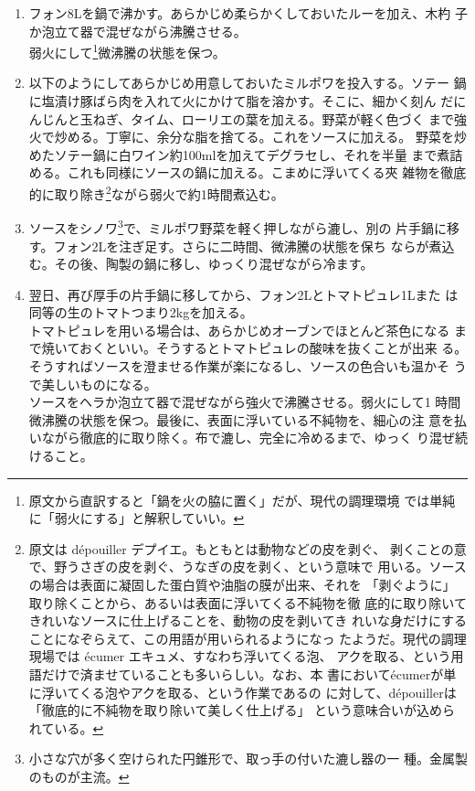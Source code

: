 \documentclass[twoside,12Q,b5j]{escoffierltjsbook}
\begin{document}
\begin{enumerate}
\def\labelenumi{\arabic{enumi}.}
\item
  フォン8Lを鍋で沸かす。あらかじめ柔らかくしておいたルーを加え、木杓
  子か泡立て器で混ぜながら沸騰させる。\\
  弱火にして\footnote{原文から直訳すると「鍋を火の脇に置く」だが、現代の調理環境
    では単純に「弱火にする」と解釈していい。}微沸騰の状態を保つ。
\item
  以下のようにしてあらかじめ用意しておいたミルポワを投入する。ソテー
  鍋に塩漬け豚ばら肉を入れて火にかけて脂を溶かす。そこに、細かく刻ん
  だにんじんと玉ねぎ、タイム、ローリエの葉を加える。野菜が軽く色づく
  まで強火で炒める。丁寧に、余分な脂を捨てる。これをソースに加える。
  野菜を炒めたソテー鍋に白ワイン約100mlを加えてデグラセし、それを半量
  まで煮詰める。これも同様にソースの鍋に加える。こまめに浮いてくる夾
  雑物を徹底的に取り除き\footnote{原文は dépouiller
    デプイエ。もともとは動物などの皮を剥ぐ、
    剥くことの意で、野うさぎの皮を剥ぐ、うなぎの皮を剥く、という意味で
    用いる。ソースの場合は表面に凝固した蛋白質や油脂の膜が出来、それを
    「剥ぐように」取り除くことから、あるいは表面に浮いてくる不純物を徹
    底的に取り除いてきれいなソースに仕上げることを、動物の皮を剥いてき
    れいな身だけにすることになぞらえて、この用語が用いられるようになっ
    たようだ。現代の調理現場では écumer エキュメ、すなわち浮いてくる泡、
    アクを取る、という用語だけで済ませていることも多いらしい。なお、本
    書においてécumerが単に浮いてくる泡やアクを取る、という作業であるの
    に対して、dépouillerは「徹底的に不純物を取り除いて美しく仕上げる」
    という意味合いが込められている。}ながら弱火で約1時間煮込む。
\item
  ソースをシノワ\footnote{小さな穴が多く空けられた円錐形で、取っ手の付いた漉し器の一
    種。金属製のものが主流。}で、ミルポワ野菜を軽く押しながら漉し、別の
  片手鍋に移す。フォン2Lを注ぎ足す。さらに二時間、微沸騰の状態を保ち
  ならが煮込む。その後、陶製の鍋に移し、ゆっくり混ぜながら冷ます。
\item
  翌日、再び厚手の片手鍋に移してから、フォン2Lとトマトピュレ1Lまた
  は同等の生のトマトつまり2kgを加える。\\
  トマトピュレを用いる場合は、あらかじめオーブンでほとんど茶色になる
  まで焼いておくといい。そうするとトマトピュレの酸味を抜くことが出来
  る。\\
  そうすればソースを澄ませる作業が楽になるし、ソースの色合いも温かそ
  うで美しいものになる。\\
  ソースをヘラか泡立て器で混ぜながら強火で沸騰させる。弱火にして1
  時間微沸騰の状態を保つ。最後に、表面に浮いている不純物を、細心の注
  意を払いながら徹底的に取り除く。布で漉し、完全に冷めるまで、ゆっく
  り混ぜ続けること。
\end{enumerate}
\end{document}
